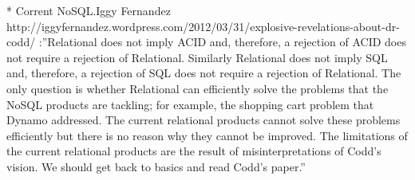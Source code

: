 * Corrent NoSQL.Iggy Fernandez http://iggyfernandez.wordpress.com/2012/03/31/explosive-revelations-about-dr-codd/ :''Relational does not imply ACID and, therefore, a rejection of ACID does not require a rejection of Relational. Similarly Relational does not imply SQL and, therefore, a rejection of SQL does not require a rejection of Relational. The only question is whether Relational can efficiently solve the problems that the NoSQL products are tackling; for example, the shopping cart problem that Dynamo addressed. The current relational products cannot solve these problems efficiently but there is no reason why they cannot be improved. The limitations of the current relational products are the result of misinterpretations of Codd’s vision. We should get back to basics and read Codd’s paper.''